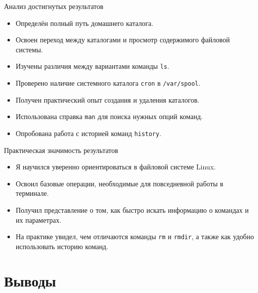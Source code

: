 \documentclass[
  ignorenonframetext,
  aspectratio=169,
  russian,
  aspectratio=169]{beamer}
\providecommand{\tightlist}{%
  \setlength{\itemsep}{0pt}\setlength{\parskip}{0pt}}
\begin{document}
\begin{frame}[fragile]{Анализ достигнутых результатов}
\protect{}\label{ux430ux43dux430ux43bux438ux437-ux434ux43eux441ux442ux438ux433ux43dux443ux442ux44bux445-ux440ux435ux437ux443ux43bux44cux442ux430ux442ux43eux432}
\begin{itemize}[<+->]
\tightlist
\item
  Определён полный путь домашнего каталога.
\item
  Освоен переход между каталогами и просмотр содержимого файловой
  системы.
\item
  Изучены различия между вариантами команды \texttt{ls}.
\item
  Проверено наличие системного каталога \texttt{cron} в
  \texttt{/var/spool}.
\item
  Получен практический опыт создания и удаления каталогов.
\item
  Использована справка \texttt{man} для поиска нужных опций команд.
\item
  Опробована работа с историей команд \texttt{history}.
\end{itemize}
\end{frame}

\begin{frame}[fragile]{Практическая значимость результатов}
\protect{}\label{ux43fux440ux430ux43aux442ux438ux447ux435ux441ux43aux430ux44f-ux437ux43dux430ux447ux438ux43cux43eux441ux442ux44c-ux440ux435ux437ux443ux43bux44cux442ux430ux442ux43eux432}
\begin{itemize}[<+->]
\tightlist
\item
  Я научился уверенно ориентироваться в файловой системе Linux.
\item
  Освоил базовые операции, необходимые для повседневной работы в
  терминале.
\item
  Получил представление о том, как быстро искать информацию о командах и
  их параметрах.
\item
  На практике увидел, чем отличаются команды \texttt{rm} и
  \texttt{rmdir}, а также как удобно использовать историю команд.
\end{itemize}
\end{frame}

\section{Выводы}\label{ux432ux44bux432ux43eux434ux44b}
\end{document}
